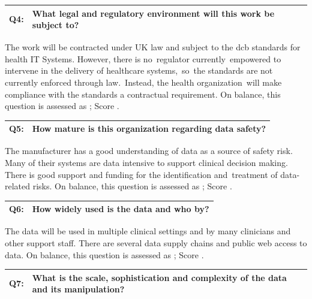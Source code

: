 \addtocounter{table}{-1} %
\begin{longtable*}[H]
	{|L{}|L{}|}
	\hline
	Q4: & What legal and regulatory environment will this work be subject to?\\
	\hline
\end{longtable*}

The work will be contracted under UK law and subject to the \gls{dcb}
standards for health IT Systems. However, there is no\cbstart\ regulator currently\cbend\ empowered to intervene in the delivery of healthcare systems,\cbstart\ so\cbend\ the standards are not currently enforced through law.\cbstart\ Instead, the health organization\cbend\ will make compliance with the standards a contractual requirement. On balance, this question is assessed as ; Score .

\addtocounter{table}{-1} %
\begin{longtable*}[H]
	{|L{}|L{}|}
	\hline
	Q5: & How mature is this organization regarding data safety?\\
	\hline
\end{longtable*}

The manufacturer has a good understanding of data as a source of safety risk. Many of their systems are data intensive to support clinical decision making. There is good support and funding for the identification and\cbstart\ treatment\cbend{} of data-related risks. On balance, this question is assessed as ; Score .

\addtocounter{table}{-1} %
\begin{longtable*}[H]
	{|L{}|L{}|}
	\hline
	Q6: & How widely used is the data and who by?\\
	\hline
\end{longtable*}

The data will be used in multiple clinical settings and by many clinicians and other support staff. There are several data supply chains and public web access to data. On balance, this question is assessed as ; Score .

\addtocounter{table}{-1} %
\begin{longtable*}[H]
	{|L{}|L{}|}
	\hline
	Q7: & What is the scale, sophistication and complexity of the data and its manipulation?\\
	\hline
\end{longtable*}

